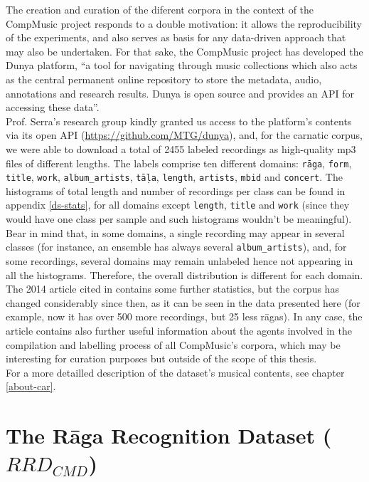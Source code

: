 The creation and curation of the diferent corpora in the context of the CompMusic project responds to a double motivation: it allows the reproducibility of the experiments, and also serves as basis for any data-driven approach that may also be undertaken. For that sake, the CompMusic project has developed the Dunya platform, ``a tool for navigating through music collections which also acts as the central permanent online repository to store the metadata, audio, annotations and research results. Dunya is open source and provides an API for accessing these data''\cite{indian-corpora}.\\

Prof. Serra's research group kindly granted us access to the platform's contents via its open API (\url{https://github.com/MTG/dunya}), and, for the carnatic corpus, we were able to download a total of 2455 labeled recordings as high-quality mp3 files of different lengths. The labels comprise ten different domains: \texttt{r\=aga}, \texttt{form}, \texttt{title}, \texttt{work}, \texttt{album\_artists}, \texttt{t\=a\d{l}a}, \texttt{length}, \texttt{artists}, \texttt{mbid} and \texttt{concert}. The histograms of total length and number of recordings per class can be found in appendix \ref{ds-stats}, for all domains except \texttt{length}, \texttt{title} and \texttt{work} (since they would have one class per sample and such histograms wouldn't be meaningful). Bear in mind that, in some domains, a single recording may appear in several classes (for instance, an ensemble has always several \texttt{album\_artists}), and, for some recordings, several domains may remain unlabeled hence not appearing in all the histograms. Therefore, the overall distribution is different for each domain. The 2014 article cited in \cite{indian-corpora} contains some further statistics, but the corpus has changed considerably since then, as it can be seen in the data presented here (for example, now it has over 500 more recordings, but 25 less r\=agas). In any case, the article contains also further useful information about the agents involved in the compilation and labelling process of all CompMusic's corpora, which may be interesting for curation purposes but outside of the scope of this thesis.\\

For a more detailled description of the dataset's musical contents, see chapter \ref{about-car}.


\section{The R\=aga Recognition Dataset (\(RRD_{CMD}\))} \label{rrd_cmd}

